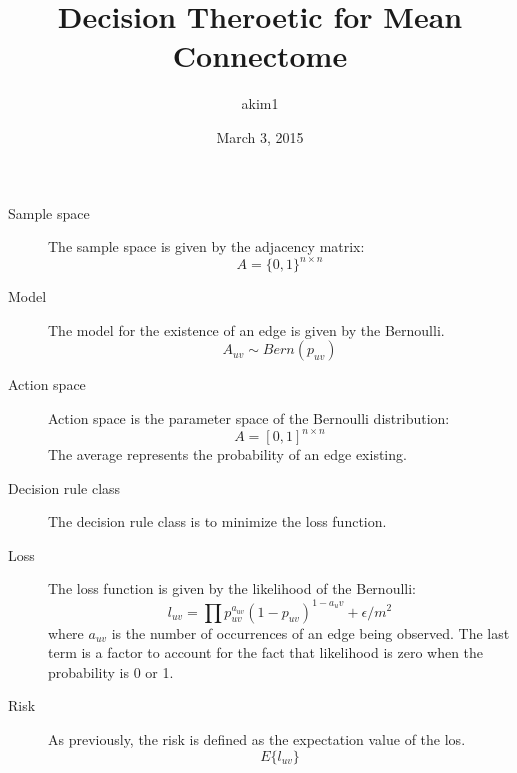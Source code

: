 \documentclass{article}
\title{Decision Theroetic for Mean Connectome}
\author{akim1}
\date{March 3, 2015}
\begin{document}
\maketitle

\begin{description}
\item[Sample space]
The sample space is given by the adjacency matrix:
\begin{equation*}
A=\{0,1\}^{n\times n}
\end{equation*}

\item[Model]
The model for the existence of an edge is given by the Bernoulli.
\begin{equation*}
A_{uv}\sim\mathit{Bern}(p_{uv})
\end{equation*}

\item[Action space]
Action space is the parameter space of the Bernoulli distribution:
\begin{equation*}
A=[0,1]^{n\times n}
\end{equation*}
The average represents the probability of an edge existing.

\item[Decision rule class]
The decision rule class is to minimize the loss function.

\item[Loss]
The loss function is given by the likelihood of the Bernoulli:
\begin{equation*}
l_{uv}=\prod p_{uv}^{a_{uv}}(1-p_{uv})^{1-a_uv}+\epsilon/m^2
\end{equation*}
where $a_{uv}$ is the number of occurrences of an edge being observed. The last
term is a factor to account for the fact that likelihood is zero when the
probability is 0 or 1.

\item[Risk]
As previously, the risk is defined as the expectation value of the los.
\begin{equation*}
E\{l_{uv}\}
\end{equation*}
\end{description}
\end{document}
